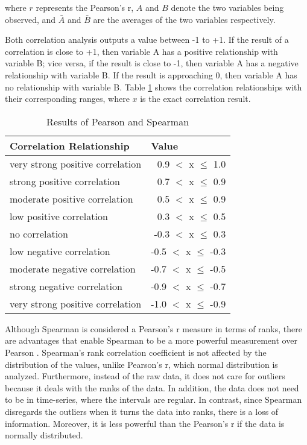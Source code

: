\noindent where $r$ represents the Pearson’s r, $A$ and $B$ denote the two variables being observed, and $\bar{A}$ and $\bar{B}$ are the averages of the two variables respectively. 

Both correlation analysis outputs a value between -1 to +1. If the result of a correlation is close to +1, then variable A has a positive relationship with variable B; vice versa, if the result is close to -1, then variable A has a negative relationship with variable B. If the result is approaching 0, then variable A has no relationship with variable B. Table \ref{table:correlation-results} shows the correlation relationships with their corresponding ranges, where $x$ is the exact correlation result. 


\begin{table}[h]
\centering
\caption{Results of Pearson and Spearman}
\label{table:correlation-results}
\begin{tabular}{|l|r|}
\hline
Correlation Relationship         & \multicolumn{1}{l|}{Value}        \\ \hline
very strong positive correlation & 0.9 $<$ x $\leq$ 1.0   \\ \hline
strong positive correlation      & 0.7 $<$ x $\leq$ 0.9   \\ \hline
moderate positive correlation    & 0.5 $<$ x $\leq$ 0.9   \\ \hline
low positive correlation         & 0.3 $<$ x $\leq$ 0.5   \\ \hline
no correlation                   & -0.3 $<$ x $\leq$ 0.3  \\ \hline
low negative correlation         & -0.5 $<$ x $\leq$ -0.3 \\ \hline
moderate negative correlation    & -0.7 $<$ x $\leq$ -0.5 \\ \hline
strong negative correlation      & -0.9 $<$ x $\leq$ -0.7 \\ \hline
very strong positive correlation & -1.0 $<$ x $\leq$ -0.9 \\ \hline
\end{tabular}
\end{table}

Although Spearman is considered a Pearson’s r measure in terms of ranks, there are advantages that enable Spearman to be a more powerful measurement over Pearson . Spearman’s rank correlation coefficient is not affected by the distribution of the values, unlike Pearson’s r, which normal distribution is analyzed. Furthermore, instead of the raw data, it does not care for outliers because it deals with the ranks of the data. In addition, the data does not need to be in time-series, where the intervals are regular. In contrast, since Spearman disregards the outliers when it turns the data into ranks, there is a loss of information. Moreover, it is less powerful than the Pearson’s r if the data is normally distributed.

